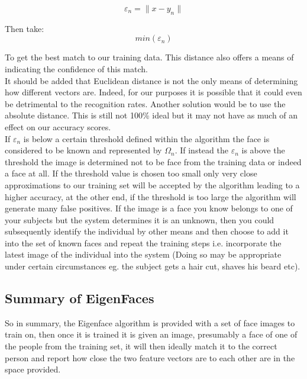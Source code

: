 			\[			\varepsilon_n = \| x - y_n \|	\] 
			
			Then take:
			\[			min(\varepsilon_n)	\]
			
			To get the best match to our training data.  This distance also offers a means of indicating the confidence of this match. \\
			
			It should be added that Euclidean distance is not the only means of determining how different vectors are.  Indeed, for our 
			purposes it is possible that it could even be detrimental to the recognition rates.  Another solution would be to use the 
			absolute distance.  This is still not 100\% ideal but it may not have as much of an effect on our accuracy scores. \\
			
			If $\varepsilon_n$ is below a certain threshold defined within the algorithm the face is 
			considered to be known and represented by $\Omega_n$.  If instead the  $\varepsilon_n$ is 
			above the threshold the image is determined not to be face from the training data or indeed 
			a face at all.  If the threshold value is chosen too small only very close approximations 
			to our training set will be accepted by the algorithm leading to a higher accuracy, at the 
			other end, if the threshold is too large the algorithm will generate many false positives.  
			If the image is a face you know belongs to one of your subjects but the system determines it 
			is an unknown, then you could subsequently identify the individual by other means and then choose 
			to add it into the set of known faces and repeat the training steps i.e. incorporate the latest 
			image of the individual into the system (Doing so may be appropriate under certain circumstances 
			eg. the subject gets a hair cut, shaves his beard etc).
			
			\subsection{Summary of EigenFaces}
			So in summary, the Eigenface algorithm is provided with a set of face images to train on, then 
			once it is trained it is given an image, presumably a face of one of the people from the training 
			set, it will then ideally match it to the correct person and report how close the two feature 
			vectors are to each other are in the space provided.  \\
			
